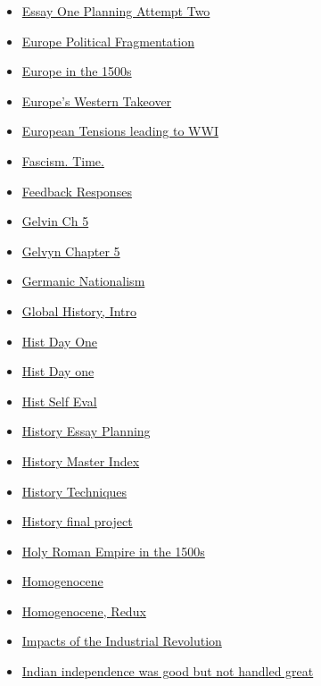 \documentclass[11pt]{article}
\begin{document}
\begin{itemize}
\begin{itemize}
\item \href{hist201/KBEssay1PlanningAttemp2.org}{Essay One Planning Attempt Two}
\item \href{hist201/KBhHIST201PoliticalFragmentationofEurope.org}{Europe Political Fragmentation}
\item \href{hist201/KBhHIST201Europe1500s.org}{Europe in the 1500s}
\item \href{hist201/KBhHIST201EuropesWesternTakeover.org}{Europe's Western Takeover}
\item \href{hist201/KBhHIST201WWIBeginning.org}{European Tensions leading to WWI}
\item \href{hist201/KBxFascism.org}{Fascism. Time.}
\item \href{hist201/KBxFeedbackResponses.org}{Feedback Responses}
\item \href{hist201/KBe20hist201floGelvinCh5.org}{Gelvin Ch 5}
\item \href{hist201/KBhHIST201GelvinChapter5.org}{Gelvyn Chapter 5}
\item \href{hist201/KBhHIST201GermanicNationalism.org}{Germanic Nationalism}
\item \href{hist201/KBhHIST201GHIntro.org}{Global History, Intro}
\item \href{hist201/KBxDayOne.org}{Hist Day One}
\item \href{hist201/KB20200824141300.org}{Hist Day one}
\item \href{hist201/KBxHistSelfEval2020.org}{Hist Self Eval}
\item \href{hist201/KBhHIST201WWIEssayOutlineJack.org}{History Essay Planning}
\item \href{hist201/KBHistoryMasterIndex.org}{History Master Index}
\item \href{hist201/20hist201refTechniques.org}{History Techniques}
\item \href{hist201/KBe21hist201retFinalProject.org}{History final project}
\item \href{hist201/KBhHIST201HolyRomanEmpire1500s.org}{Holy Roman Empire in the 1500s}
\item \href{hist201/KBhHIST201HomogenosceneLN.org}{Homogenocene}
\item \href{hist201/KBhHIST201HomogenosceneRedux.org}{Homogenocene, Redux}
\item \href{hist201/KBhHIST201ImpactsofIR.org}{Impacts of the Industrial Revolution}
\item \href{hist201/KBe21hist201floBittersweetIndianIndependence.org}{Indian independence was good but not handled great}

\end{itemize}
\end{itemize}
\end{document}
